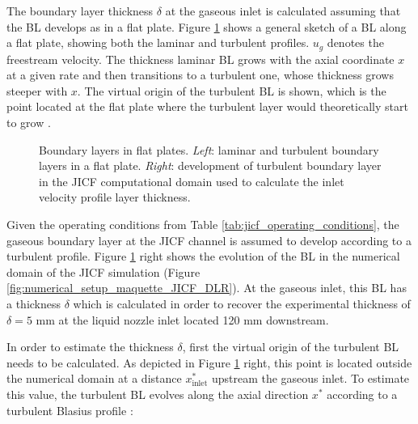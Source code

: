 The boundary layer thickness $\delta$ at the gaseous inlet is calculated assuming that the BL develops as in a flat plate. Figure \ref{fig:BLs_gaseous_inlet_setup} shows a general sketch of a BL along a flat plate, showing both the laminar and turbulent profiles. $u_g$ denotes the freestream velocity. The thickness laminar BL grows with the axial coordinate $x$ at a given rate and then transitions to a turbulent one, whose thickness grows steeper with $x$. The virtual origin of the turbulent BL is shown, which is the point located at the flat plate where the turbulent layer would theoretically start to grow .

\begin{figure}[ht]
     \centering
     \begin{subfigure}[b]{0.45\textwidth}
         \centering
     \end{subfigure}
     \begin{subfigure}[b]{0.45\textwidth} 
         \centering
     \end{subfigure}
        \caption[Boundary layers in flat plates]{Boundary layers in flat plates. \textsl{Left}: laminar and turbulent boundary layers in a flat plate. \textsl{Right}: development of turbulent boundary layer in the JICF computational domain used to calculate the inlet velocity profile layer thickness.}
        \label{fig:BLs_gaseous_inlet_setup}
\end{figure}

Given the operating conditions from Table \ref{tab:jicf_operating_conditions}, the gaseous boundary layer at the JICF channel is assumed to develop according to a turbulent profile. Figure \ref{fig:BLs_gaseous_inlet_setup} right shows the evolution of the BL in the numerical domain of the JICF simulation (Figure \ref{fig:numerical_setup_maquette_JICF_DLR}). At the gaseous inlet, this BL has a thickness $\delta$ which is calculated in order to recover the experimental thickness of $\delta = 5$ mm at the liquid nozzle inlet located 120 mm downstream. 

In order to estimate the thickness $\delta$, first the virtual origin of the turbulent BL needs to be calculated. As depicted in Figure \ref{fig:BLs_gaseous_inlet_setup} right, this point is located outside the numerical domain at a distance $x^*_\mathrm{inlet}$ upstream the gaseous inlet. To estimate this value, the turbulent BL evolves along the axial direction $x^*$ according to a turbulent Blasius profile :

